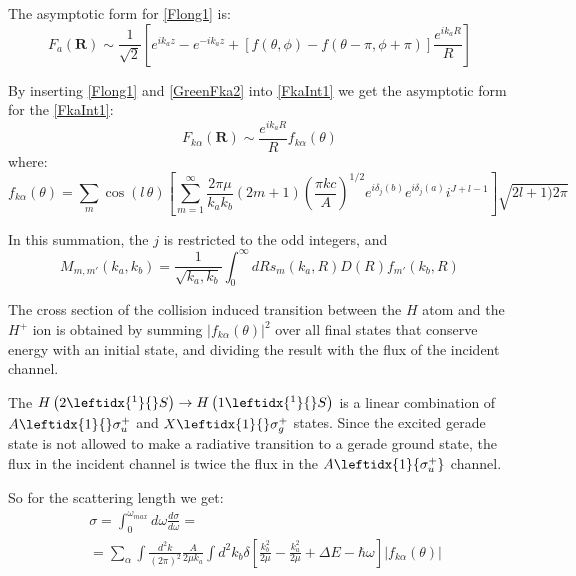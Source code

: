 The asymptotic form for \eqref{Flong1} is:
\begin{equation}\label{FlongA}
F_a(\mathbf{R}) \sim \frac{1}{\sqrt{2}}\left[e^{ik_az}-e^{-ik_az} + [f(\theta,\phi) - f(\theta-\pi,\phi+\pi)]\frac{e^{ik_aR}}{R}\right]
\end{equation}

By inserting \eqref{Flong1} and \eqref{GreenFka2} into \eqref{FkaInt1} we get the asymptotic form for the  \eqref{FkaInt1}:
\begin{equation}\label{FlongAA1}
F_{k\alpha}(\mathbf{R}) \sim \frac{e^{ik_aR}}{R}f_{k\alpha}(\theta)
\end{equation}
where:
\begin{equation}\label{fkaa1}
f_{k\alpha}(\theta) = \sum_{m}{\cos(l\,\theta)\left[\sum_{m=1}^{\infty}{\frac{2\pi\mu}{k_ak_b}(2m+1)\left(\frac{\pi k c}{A}\right)^{1/2}e^{i\delta_j(b)}e^{i\delta_j(a)}i^{J+l-1} }\right]\sqrt{2l+1)2\pi}}
\end{equation}

In this summation, the $ j $ is restricted to the odd integers, and 
\begin{equation}\label{Mll1}
M_{m,m'}(k_a,k_b) = \frac{1}{\sqrt{k_a,k_b}}\int_0^{\infty}{dRs_m(k_a,R)D(R)f_{m'}(k_b,R)} 
\end{equation}

The cross section of the collision induced transition between the $ H $ atom and the $ H^{+} $ ion is obtained by summing $ \left|f_{k\alpha}(\theta)\right|^2 $ over all final states that conserve energy with an initial state, and dividing the result with the flux of the incident channel.

The $ H\left(2 \leftidx{^1}{}S\right) \rightarrow H\left(1 \leftidx{^1}{}S\right) $ is a linear combination of $ A \leftidx{1}{}\sigma_u^{+} $ and $ X \leftidx{1}{}\sigma_g^{+} $ states. Since the excited gerade state is not allowed to make a radiative transition to a gerade ground state, the flux in the incident channel is twice the flux in the $ A \leftidx{1}{\sigma_u^{+}} $ channel.

So for the scattering length we get:
\begin{equation}\label{crs1}
\begin{split}
& \sigma = \int_0^{\omega_{max}}{d\omega\frac{d\sigma}{d\omega}} = \\[.8em]
& = \sum_{\alpha}{\int{\frac{d^2k}{(2\pi)^2}\frac{A}{2\mu k_a}\int{d^2k_b\delta\left[\frac{k_b^2}{2\mu} - \frac{k_a^2}{2\mu} + \Delta E - \hbar\omega \right]\left|f_{k\alpha}(\theta) \right| } } }
\end{split}
\end{equation}


